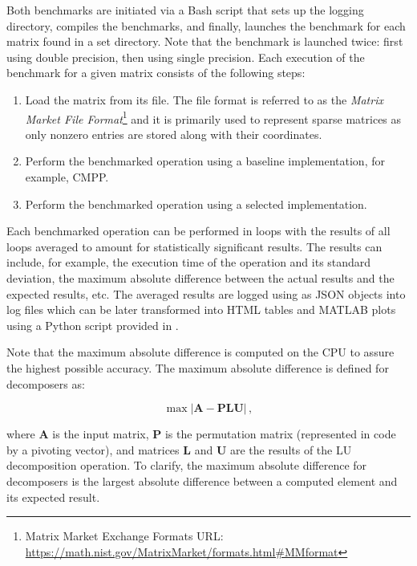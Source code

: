 Both benchmarks are initiated via a Bash script that sets up the logging directory, compiles the benchmarks, and finally, launches the benchmark for each matrix found in a set directory.
Note that the benchmark is launched twice: first using double precision, then using single precision.
Each execution of the benchmark for a given matrix consists of the following steps:

\begin{enumerate}
	\item Load the matrix from its  file.
The  file format is referred to as the \textit{Matrix Market File Format}\footnote{Matrix Market Exchange Formats URL: \url{https://math.nist.gov/MatrixMarket/formats.html\#MMformat}} and it is primarily used to represent sparse matrices as only nonzero entries are stored along with their coordinates.
	\item \label{Item:implementation->decomposition-project->benchmarks->procedure->baseline-operation}
		Perform the benchmarked operation using a baseline implementation, for example, CMPP.
	\item \label{Item:implementation->decomposition-project->benchmarks->procedure->selected-operations}
		Perform the benchmarked operation using a selected implementation.
\end{enumerate}

Each benchmarked operation can be performed in loops with the results of all loops averaged to amount for statistically significant results.
The results can include, for example, the execution time of the operation and its standard deviation, the maximum absolute difference between the actual results and the expected results, etc.
The averaged results are logged using  as JSON objects into log files which can be later transformed into HTML tables and MATLAB plots using a Python script provided in .

Note that the maximum absolute difference is computed on the CPU to assure the highest possible accuracy.
The maximum absolute difference is defined for decomposers as:

\begin{equation}
	\max \left| \mathbf{A} - \mathbf{PLU} \right| \,,
	\label{Equation:implementation->decomposition-project->benchmarks->decomposers->maximum-difference}
\end{equation}

where $\mathbf{A}$ is the input matrix, $\mathbf{P}$ is the permutation matrix (represented in code by a pivoting vector), and matrices $\mathbf{L}$ and $\mathbf{U}$ are the results of the LU decomposition operation.
To clarify, the maximum absolute difference for decomposers is the largest absolute difference between a computed element and its expected result.

